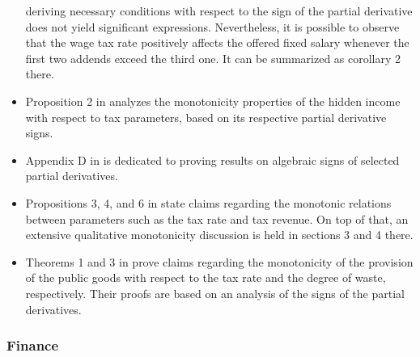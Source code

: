 \documentclass[11pt]{book}
\begin{document}
\begin{itemize}
deriving necessary conditions with respect to the sign of the partial
derivative does not yield significant expressions. Nevertheless, it
is possible to observe that the wage tax rate positively affects the
offered fixed salary whenever the first two addends exceed the third
one. It can be summarized as corollary 2 there.
\item Proposition 2 in \cite{di2017productivity}
analyzes the monotonicity properties of the hidden income with respect
to tax parameters, based on its respective partial derivative signs.
\item Appendix D in \cite{niemann2019investment}
is dedicated to proving results on algebraic signs of selected partial
derivatives.
\item Propositions 3, 4, and 6 in \cite{bloch2019profit}
state claims regarding the monotonic relations between parameters
such as the tax rate and tax revenue. On top of that, an extensive
qualitative monotonicity discussion is held in sections 3 and 4 there.
\item Theorems 1 and 3 in \cite{sheremeta2021impact}
prove claims regarding the monotonicity of the provision of the public
goods with respect to the tax rate and the degree of waste, respectively.
Their proofs are based on an analysis of the signs of the partial
derivatives.
\end{itemize}
\subsubsection{Finance}
\end{document}
